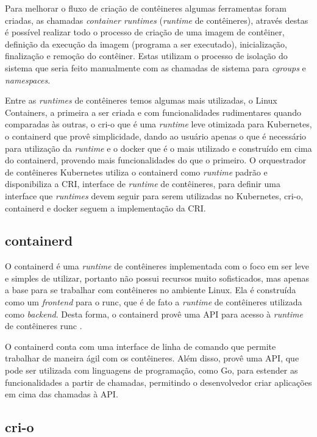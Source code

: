 Para melhorar o fluxo de criação de contêineres algumas ferramentas foram criadas,
as chamadas \textit{container runtimes} (\textit{runtime} de contêineres), através destas
é possível realizar todo o processo de criação de uma imagem de contêiner, definição
da execução da imagem (programa a ser executado), inicialização, finalização e
remoção do contêiner. Estas utilizam o processo de isolação do sistema
que seria feito manualmente com as chamadas de sistema para \textit{cgroups} e
\textit{namespaces}.

Entre as \textit{runtimes} de contêineres temos algumas mais utilizadas, o Linux Containers,
a primeira a ser criada e com funcionalidades rudimentares quando comparadas às outras, o
cri-o que é uma \textit{runtime} leve otimizada para Kubernetes, o
containerd que provê simplicidade, dando ao usuário apenas o que é necessário
para utilização da \textit{runtime} e o docker que é o mais utilizado e construído
em cima do containerd, provendo mais funcionalidades do que o primeiro. O orquestrador
de contêineres Kubernetes utiliza o containerd como \textit{runtime} padrão e disponibiliza
a CRI, interface de \textit{runtime} de contêineres, para definir uma interface que
\textit{runtimes} devem seguir para serem utilizadas no Kubernetes, cri-o, containerd e
docker seguem a implementação da CRI.

\subsection{containerd}

O containerd é uma \textit{runtime} de contêineres implementada com o foco em
ser leve e simples de utilizar, portanto não possui recursos muito sofisticados,
mas apenas a base para se trabalhar com contêineres no ambiente Linux. Ela é
construída como um \textit{frontend} para o runc, que é de fato a \textit{runtime}
de contêineres utilizada como \textit{backend}. Desta forma, o containerd provê
uma API para acesso à \textit{runtime} de contêineres runc \cite{containerd}.

O containerd conta com uma interface de linha de comando que permite trabalhar
de maneira ágil com os contêineres. Além disso, provê uma API, que pode ser
utilizada com linguagens de programação, como Go, para estender as funcionalidades
a partir de chamadas, permitindo o desenvolvedor criar aplicações em cima das
chamadas à API.

\subsection{cri-o}

